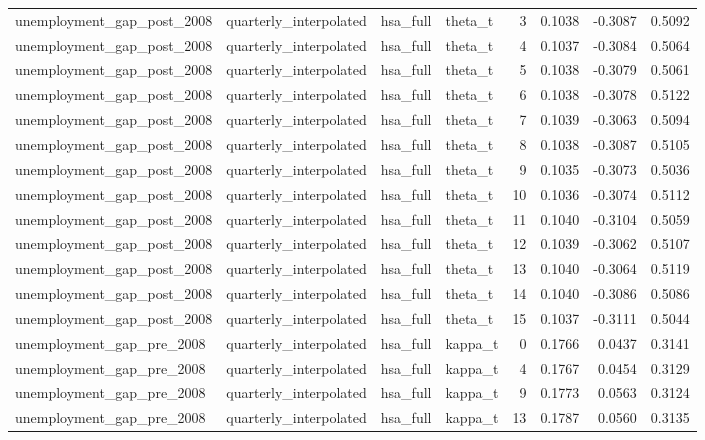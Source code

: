 \begin{tabular}{llllrrrr}
unemployment\_gap\_post\_2008 & quarterly\_interpolated & hsa\_full & theta\_t & 3 & 0.1038 & -0.3087 & 0.5092 \\
unemployment\_gap\_post\_2008 & quarterly\_interpolated & hsa\_full & theta\_t & 4 & 0.1037 & -0.3084 & 0.5064 \\
unemployment\_gap\_post\_2008 & quarterly\_interpolated & hsa\_full & theta\_t & 5 & 0.1038 & -0.3079 & 0.5061 \\
unemployment\_gap\_post\_2008 & quarterly\_interpolated & hsa\_full & theta\_t & 6 & 0.1038 & -0.3078 & 0.5122 \\
unemployment\_gap\_post\_2008 & quarterly\_interpolated & hsa\_full & theta\_t & 7 & 0.1039 & -0.3063 & 0.5094 \\
unemployment\_gap\_post\_2008 & quarterly\_interpolated & hsa\_full & theta\_t & 8 & 0.1038 & -0.3087 & 0.5105 \\
unemployment\_gap\_post\_2008 & quarterly\_interpolated & hsa\_full & theta\_t & 9 & 0.1035 & -0.3073 & 0.5036 \\
unemployment\_gap\_post\_2008 & quarterly\_interpolated & hsa\_full & theta\_t & 10 & 0.1036 & -0.3074 & 0.5112 \\
unemployment\_gap\_post\_2008 & quarterly\_interpolated & hsa\_full & theta\_t & 11 & 0.1040 & -0.3104 & 0.5059 \\
unemployment\_gap\_post\_2008 & quarterly\_interpolated & hsa\_full & theta\_t & 12 & 0.1039 & -0.3062 & 0.5107 \\
unemployment\_gap\_post\_2008 & quarterly\_interpolated & hsa\_full & theta\_t & 13 & 0.1040 & -0.3064 & 0.5119 \\
unemployment\_gap\_post\_2008 & quarterly\_interpolated & hsa\_full & theta\_t & 14 & 0.1040 & -0.3086 & 0.5086 \\
unemployment\_gap\_post\_2008 & quarterly\_interpolated & hsa\_full & theta\_t & 15 & 0.1037 & -0.3111 & 0.5044 \\
unemployment\_gap\_pre\_2008 & quarterly\_interpolated & hsa\_full & kappa\_t & 0 & 0.1766 & 0.0437 & 0.3141 \\
unemployment\_gap\_pre\_2008 & quarterly\_interpolated & hsa\_full & kappa\_t & 4 & 0.1767 & 0.0454 & 0.3129 \\
unemployment\_gap\_pre\_2008 & quarterly\_interpolated & hsa\_full & kappa\_t & 9 & 0.1773 & 0.0563 & 0.3124 \\
unemployment\_gap\_pre\_2008 & quarterly\_interpolated & hsa\_full & kappa\_t & 13 & 0.1787 & 0.0560 & 0.3135 \\

\end{tabular}
